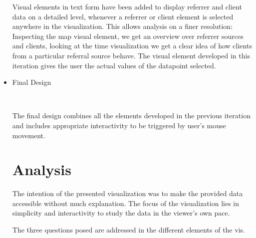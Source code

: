 \documentclass[12pt]{article}
\begin{document}
\begin{itemize}
Visual elements in text form have been added to display referrer and client data on a detailed level, whenever a
referrer or client element is selected anywhere in the visualization. This allows analysis on a finer resolution:
Inspecting the map visual element, we get an overview over referrer sources and clients,  looking at the time visualization we get a clear idea of how clients from a particular referral source behave. The visual element developed 
in this iteration gives the user the actual values of the datapoint selected.

\item Final Design

\begin{center}
 \\
\end{center}

The final design combines all the elements developed in the previous iteration and includes appropriate interactivity to be triggered by
user's mouse movement.

\section{Analysis}

The intention of the presented visualization was to make the provided data accessible without much explanation. The focus of the visualization 
lies in simplicity and interactivity to study the data in the viewer's own pace.

The three questions posed are addressed in the different elements of the vis.


\end{itemize}
\end{document}
